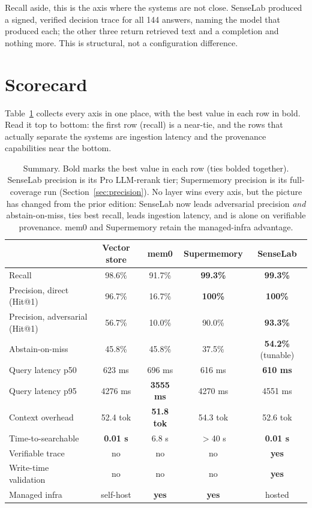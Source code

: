 \documentclass[11pt]{article}
\newcommand{\best}[1]{\textbf{#1}}
\begin{document}
Recall aside, this is the axis where the systems are not close. SenseLab produced a signed, verified
decision trace for all 144 answers, naming the model that produced each; the other three return
retrieved text and a completion and nothing more. This is structural, not a configuration difference.

\section{Scorecard}

Table~\ref{tab:scorecard} collects every axis in one place, with the best value in each row in bold.
Read it top to bottom: the first row (recall) is a near-tie, and the rows that actually separate the
systems are ingestion latency and the provenance capabilities near the bottom.

\begin{table}[t]
\centering
\small
\renewcommand{\arraystretch}{1.15}
\begin{tabular}{lcccc}
\toprule
& Vector store & mem0 & Supermemory & SenseLab \\
\midrule
Recall               & 98.6\% & 91.7\% & \best{99.3\%} & \best{99.3\%} \\
Precision, direct (Hit@1)    & 96.7\% & 16.7\% & \best{100\%} & \best{100\%} \\
Precision, adversarial (Hit@1) & 56.7\% & 10.0\% & 90.0\% & \best{93.3\%} \\
Abstain-on-miss      & 45.8\% & 45.8\% & 37.5\% & \best{54.2\%} (tunable) \\
Query latency p50    & 623 ms & 696 ms & 616 ms & \best{610 ms} \\
Query latency p95    & 4276 ms & \best{3555 ms} & 4270 ms & 4551 ms \\
Context overhead     & 52.4 tok & \best{51.8 tok} & 54.3 tok & 52.6 tok \\
Time-to-searchable   & \best{0.01 s} & 6.8 s & $>$40 s & \best{0.01 s} \\
Verifiable trace     & no & no & no & \best{yes} \\
Write-time validation& no & no & no & \best{yes} \\
Managed infra        & self-host & \best{yes} & \best{yes} & hosted \\
\bottomrule
\end{tabular}
\caption{Summary. Bold marks the best value in each row (ties bolded together). SenseLab precision is
its Pro LLM-rerank tier; Supermemory precision is its full-coverage run (Section~\ref{sec:precision}).
No layer wins every axis, but the picture has changed from the prior edition: SenseLab now leads
adversarial precision \emph{and} abstain-on-miss, ties best recall, leads ingestion latency, and is
alone on verifiable provenance. mem0 and Supermemory retain the managed-infra advantage.}
\label{tab:scorecard}
\end{table}
\end{document}
